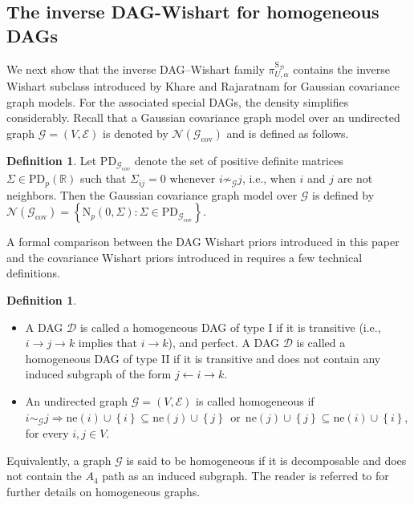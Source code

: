 \documentclass[12pt]{article}
\newcommand{\R}{\mathbb{R}}
\newcommand{\D}{\mathcal{D}}
\newcommand{\G}{\mathcal{G}}
\theoremstyle{plain}
\theoremstyle{definition}
\newtheorem{definition}[theorem]{Definition}
\theoremstyle{remark}
\begin{document}
\subsection*{The inverse DAG-Wishart for homogeneous DAGs}\label{sub:wh}
We next show that the inverse DAG--Wishart family
\(\pi_{U,\alpha}^{\mathrm{S}_\D}\) contains the inverse Wishart subclass
introduced by Khare and Rajaratnam \cite{khare09a*} for Gaussian
covariance graph models.  For the associated special DAGs, the density
simplifies considerably.  Recall that a Gaussian covariance graph
model over an undirected graph \(\G=(V,\mathscr E)\) is denoted by
\(\mathscr N(\G_{\mathrm{cov}})\) and is defined as follows.
\begin{definition}Let $\mathrm{PD}_{\G_{\mathrm cov}}$ denote the set of positive definite matrices $\Sigma\in \mathrm{PD}_{p}(\R)$ such that $\Sigma_{ij}=0$ whenever $i\not\sim_{\G}j$, i.e., when $i$ and $j$ are not neighbors. Then the Gaussian covariance graph model over $\G$  is defined by $\mathscr{N}(\G_{\mathrm{cov}})=\left\{ \mathrm{N}_{p}(0,\Sigma): \Sigma\in \mathrm{PD}_{\G_{\mathrm{cov}}}\right\}$.
\end{definition}
A formal comparison between the DAG Wishart priors introduced in this paper and the covariance Wishart priors introduced in \cite{khare09a*} requires a few technical definitions.
%
\begin{definition}\label{def:homog_property}
\begin{itemize}
\renewcommand{\labelitemi}{$a)$}
\item A DAG $\D$ is called a homogeneous DAG of type I if it is transitive (i.e., $i\rightarrow j\rightarrow k$ implies that $i\rightarrow k$), and perfect. A DAG $\D$ is called a homogeneous DAG of type II if it is transitive and does not contain any induced subgraph of the form $j\leftarrow i\rightarrow k$.
\renewcommand{\labelitemi}{$b)$}
\item An undirected graph $\G=(V, \mathscr{E})$ is called homogeneous if 
\smallskip
$i\sim_{\G}j \Longrightarrow \mathrm{ne}(i)\cup \left\{ i\right\}\subseteq\mathrm{ne}(j)\cup \left\{j\right\}\:\: \text{or}\:\: \mathrm{ne}(j)\cup \left\{j \right\}\subseteq\mathrm{ne}(i)\cup\left\{ i\right\}$, for every $i,j\in V$.
\end{itemize}
\noindent Equivalently, a graph $\G$ is said to be homogeneous if it is decomposable and does not contain the $A_4$ path as an induced subgraph. The reader is referred to \cite{letac07*} for further details on homogeneous graphs.
\end{definition}
\end{document}
